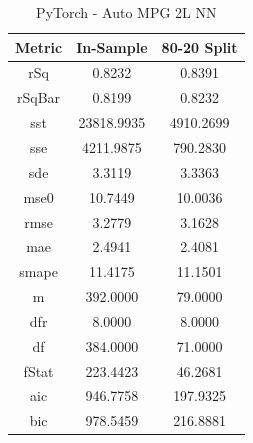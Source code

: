 \documentclass{article}
\begin{document}
\begin{table}[H]
\centering
\caption{PyTorch - Auto MPG 2L NN}
\label{tab:PyTorch - Auto MPG 2L NN}
\begin{tabular}{|c|c|c|}\hline
Metric & In-Sample & 80-20 Split \\ \hline \hline
rSq & 0.8232 & 0.8391 \\ \hline
rSqBar & 0.8199 & 0.8232 \\ \hline
sst & 23818.9935 & 4910.2699 \\ \hline
sse & 4211.9875 & 790.2830 \\ \hline
sde & 3.3119 & 3.3363 \\ \hline
mse0 & 10.7449 & 10.0036 \\ \hline
rmse & 3.2779 & 3.1628 \\ \hline
mae & 2.4941 & 2.4081 \\ \hline
smape & 11.4175 & 11.1501 \\ \hline
m & 392.0000 & 79.0000 \\ \hline
dfr & 8.0000 & 8.0000 \\ \hline
df & 384.0000 & 71.0000 \\ \hline
fStat & 223.4423 & 46.2681 \\ \hline
aic & 946.7758 & 197.9325 \\ \hline
bic & 978.5459 & 216.8881 \\ \hline
\end{tabular}
\end{table}
\end{document}
